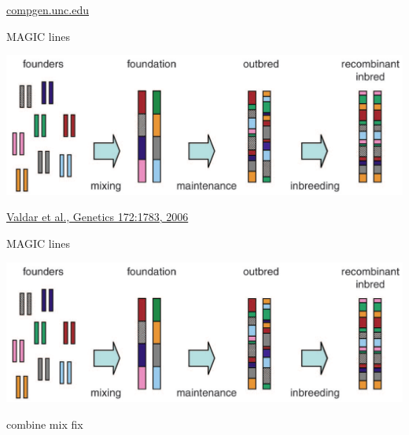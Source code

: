 \documentclass[12pt]{article}
\newcommand{\citesize}{\fontsize{14}{18} \selectfont}
\newcommand{\headsize}{\fontsize{35}{35} \selectfont}
\newcommand{\smallsize}{\fontsize{25}{30} \selectfont}
\begin{document}
\hfill {\citesize \color{citecolor} \href{http://compgen.unc.edu/wp/?page_id=99}{compgen.unc.edu}

\vspace*{5mm}


\newpage

\headsize \color{myyellow}
\hfill \begin{minipage}{5.75in}
\centering
MAGIC lines
\end{minipage}

\vspace{20mm}

\centerline{\includegraphics[width=10in]{Figs/valdar_genet2006.png}}

\vfill

\hfill {\citesize \color{citecolor} \href{http://www.genetics.org/content/172/3/1783.full}{Valdar et al., Genetics 172:1783, 2006}}

\vspace*{5mm}


\newpage

\addtocounter{page}{-1}

\headsize \color{myyellow}
\hfill \begin{minipage}{5.75in}
\centering
MAGIC lines
\end{minipage}

\vspace{20mm}

\centerline{\includegraphics[width=10in]{Figs/valdar_genet2006.png}}

\smallsize \color{myyellow}
\hspace*{52mm} combine \hspace*{35mm} mix \hspace*{52mm} fix

}
\end{document}
